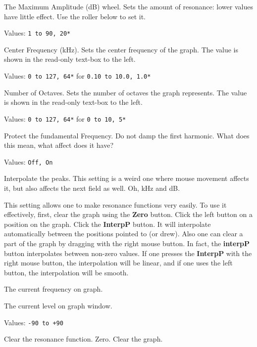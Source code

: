    The Maximum Amplitude (dB) wheel.
   Sets the amount of resonance: lower values have little effect. Use the
   roller below to set it. 

   Values: \texttt{1 to 90, 20*}

   Center Frequency (kHz).
   Sets the center frequency of the graph.
   The value is shown in the read-only text-box to the left.

   Values: \texttt{0 to 127, 64*} for \texttt{0.10 to 10.0, 1.0*}

   Number of Octaves.
   Sets the number of octaves the graph represents.
   The value is shown in the read-only text-box to the left.

   Values: \texttt{0 to 127, 64*} for \texttt{0 to 10, 5*}

   Protect the fundamental Frequency.
   Do not damp the first harmonic.
   What does this mean, what affect does it have?

   Values: \texttt{Off, On}

   Interpolate the peaks.
   This setting is a weird one where mouse movement affects it,
   but also affects the next field as well.  Oh, kHz and dB.

   This setting allows one to make resonance functions very easily.  To use
   it effectively, first, clear the graph using the \textbf{Zero} button.
   Click the left button on a position on the graph. Click the
   \textbf{InterpP} button. It will interpolate automatically between the
   positions pointed to (or drew).  Also one can clear a part of the graph
   by dragging with the right mouse button. In fact, the \textbf{interpP}
   button interpolates between non-zero values.  If one presses the
   \textbf{InterpP} with the right mouse button, the interpolation will be
   linear, and if one uses the left button, the interpolation will be
   smooth. 

   The current frequency on graph.

   The current level on graph window.

   Values: \texttt{-90 to +90}

   Clear the resonance function.
   Zero. Clear the graph.

